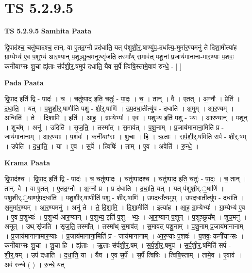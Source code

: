 \documentclass[17pt]{extarticle}
\begin{document}
\section{ TS 5.2.9.5 }

\textbf{TS 5.2.9.5 } \newline
\textbf{Samhita Paata} \newline

द्वि॒पाद॑श्च॒ चतु॑ष्पादश्च॒ तान्. वा ए॒तद॒ग्नौ प्रद॑धाति॒ यत् प॑शुशी॒र्॒.षाण्यु॑प॒-दधा᳚त्य॒-मुमा॑र॒ण्यमनु॑ ते दिशा॒मीत्या॑ह ग्रा॒म्येभ्य॑ ए॒व प॒शुभ्य॑ आर॒ण्यान् प॒शूञ्छुच॒मनूथ्सृ॑जति॒ तस्मा᳚थ् स॒माव॑त् पशू॒नां प्र॒जाय॑मानाना-मार॒ण्याः प॒शवः॒ कनी॑याꣳसः शु॒चा ह्यृ॑ताः स॑र्पशी॒र्॒.षमुप॑ दधाति॒ यैव स॒र्पे त्विषि॒स्तामे॒वाव॑ रुन्धे॒ - [  ] \newline

\textbf{Pada Paata} \newline

द्वि॒पाद॒ इति॑ द्वि - पादः॑ । च॒ । चतु॑ष्पाद॒ इति॒ चतुः॑ - पा॒दः॒ । च॒ । तान् । वै । ए॒तत् । अ॒ग्नौ । प्रेति॑ । द॒धा॒ति॒ । यत् । प॒शु॒शी॒र्॒.षाणीति॑ पशु - शी॒र्॒.षाणि॑ । उ॒प॒दधा॒तीत्यु॑प - दधा॑ति । अ॒मुम् । आ॒र॒ण्यम् । अन्विति॑ । ते॒ । दि॒शा॒मि॒ । इति॑ । आ॒ह॒ । ग्रा॒म्येभ्यः॑ । ए॒व । प॒शुभ्य॒ इति॑ प॒शु - भ्यः॒ । आ॒र॒ण्यान् । प॒शून् । शुच᳚म् । अनू॑ । उदिति॑ । सृ॒ज॒ति॒ । तस्मा᳚त् । स॒माव॑त् । प॒शू॒नाम् । प्र॒जाय॑मानाना॒मिति॑ प्र - जाय॑मानानाम् । आ॒र॒ण्याः । प॒शवः॑ । कनी॑याꣳसः । शु॒चा । हि । ऋ॒ताः । स॒र्प॒शी॒र्॒.षमिति॑ सर्प - शी॒र्॒.षम् । उपेति॑ । द॒धा॒ति॒ । या । ए॒व । स॒र्पे । त्विषिः॑ । ताम् । ए॒व । अवेति॑ । रु॒न्धे॒ ।  \newline


\textbf{Krama Paata} \newline

द्वि॒पाद॑श्च । द्वि॒पाद॒ इति॑ द्वि - पादः॑ । च॒ चतु॑ष्पादः । चतु॑ष्पादश्च । चतु॑ष्पाद॒ इति॒ चतुः॑ - पा॒दः॒ । च॒ तान् । तान्. वै । वा ए॒तत् । ए॒तद॒ग्नौ । अ॒ग्नौ प्र । प्र द॑धाति । द॒धा॒ति॒ यत् । यत् प॑शुशी॒र्.॒षाणि॑ । प॒शु॒शी॒र्.॒षाण्यु॑प॒दधा॑ति । प॒शु॒शी॒र्॒.षाणीति॑ पशु - शी॒र्॒.षाणि॑ । उ॒प॒दधा᳚त्य॒मुम् । उ॒प॒दधा॒तीत्यु॑प - दधा॑ति । अ॒मुमा॑र॒ण्यम् । आ॒र॒ण्यमनु॑ । अनु॑ ते । ते॒ दि॒शा॒मि॒ । दि॒शा॒मीति॑ । इत्या॑ह । आ॒ह॒ ग्रा॒म्येभ्यः॑ । ग्रा॒म्येभ्य॑ ए॒व । ए॒व प॒शुभ्यः॑ । प॒शुभ्य॑ आर॒ण्यान् । प॒शुभ्य॒ इति॑ प॒शु - भ्यः॒ । आ॒र॒ण्यान् प॒शून् । प॒शूञ्छुच᳚म् । शुच॒मनु॑ । अनूत् । उथ् सृ॑जति । सृ॒ज॒ति॒ तस्मा᳚त् । तस्मा᳚थ् स॒माव॑त् । स॒माव॑त् पशू॒नाम् । प॒शू॒नाम् प्र॒जाय॑मानानाम् । प्र॒जाय॑मानानामार॒ण्याः । प्र॒जाय॑मानाना॒मिति॑ प्र - जाय॑मानानाम् । आ॒र॒ण्याः प॒शवः॑ । प॒शवः॒ कनी॑याꣳसः । कनी॑याꣳसः शु॒चा । शु॒चा हि । ह्यृ॑ताः । ऋ॒ताः स॑र्पशी॒र्॒.षम् । स॒र्प॒शी॒र्॒.षमुप॑ । स॒र्प॒शी॒र्॒.षमिति॑ सर्प - शी॒र्॒.षम् । उप॑ दधाति । द॒धा॒ति॒ या । यैव । ए॒व स॒र्पे । स॒र्पे त्विषिः॑ । त्विषि॒स्ताम् । तामे॒व । ए॒वाव॑ । अव॑ रुन्धे ( ) । रु॒न्धे॒ यत् \newline
\end{document}

